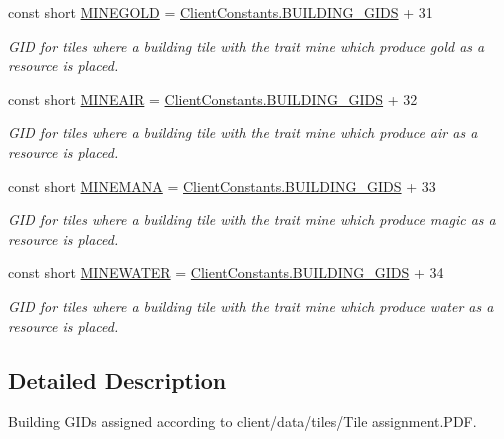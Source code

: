 \begin{DoxyCompactItemize}
const short \hyperlink{classClient_1_1Common_1_1Constants_1_1BuildingGid_a11c21e46efe88c20b1d2ab8977ebe1a3}{M\+I\+N\+E\+G\+O\+L\+D} = \hyperlink{classClient_1_1Common_1_1Constants_1_1ClientConstants_ad2e944ac733f952d3d0c2e24fe5d14ad}{Client\+Constants.\+B\+U\+I\+L\+D\+I\+N\+G\+\_\+\+G\+I\+D\+S} + 31
\begin{DoxyCompactList}\small\item\em G\+I\+D for tiles where a building tile with the trait mine which produce gold as a resource is placed. \end{DoxyCompactList}\item 
const short \hyperlink{classClient_1_1Common_1_1Constants_1_1BuildingGid_a9bf32b9e9f5bfe9e624c4629836c31fd}{M\+I\+N\+E\+A\+I\+R} = \hyperlink{classClient_1_1Common_1_1Constants_1_1ClientConstants_ad2e944ac733f952d3d0c2e24fe5d14ad}{Client\+Constants.\+B\+U\+I\+L\+D\+I\+N\+G\+\_\+\+G\+I\+D\+S} + 32
\begin{DoxyCompactList}\small\item\em G\+I\+D for tiles where a building tile with the trait mine which produce air as a resource is placed. \end{DoxyCompactList}\item 
const short \hyperlink{classClient_1_1Common_1_1Constants_1_1BuildingGid_a8c2061e84d00c88b991168f0375c3024}{M\+I\+N\+E\+M\+A\+N\+A} = \hyperlink{classClient_1_1Common_1_1Constants_1_1ClientConstants_ad2e944ac733f952d3d0c2e24fe5d14ad}{Client\+Constants.\+B\+U\+I\+L\+D\+I\+N\+G\+\_\+\+G\+I\+D\+S} + 33
\begin{DoxyCompactList}\small\item\em G\+I\+D for tiles where a building tile with the trait mine which produce magic as a resource is placed. \end{DoxyCompactList}\item 
const short \hyperlink{classClient_1_1Common_1_1Constants_1_1BuildingGid_a6a3a47119f9286cc5ebe703bcf3113ee}{M\+I\+N\+E\+W\+A\+T\+E\+R} = \hyperlink{classClient_1_1Common_1_1Constants_1_1ClientConstants_ad2e944ac733f952d3d0c2e24fe5d14ad}{Client\+Constants.\+B\+U\+I\+L\+D\+I\+N\+G\+\_\+\+G\+I\+D\+S} + 34
\begin{DoxyCompactList}\small\item\em G\+I\+D for tiles where a building tile with the trait mine which produce water as a resource is placed. \end{DoxyCompactList}\end{DoxyCompactItemize}


\subsection{Detailed Description}
Building G\+I\+Ds assigned according to \textquotesingle{}client/data/tiles/\+Tile assignment.\+P\+D\+F\textquotesingle{}. 



